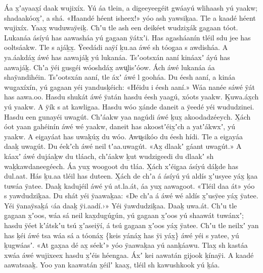 \begin{pairs}
\begin{Leftside}
Áa x̱ʼayaax̱í daak wujixíx.
Yú áa tlein, a digeeyeegéit gwáayú wlihaash yú yaakw; shadaakóox̱ʼ, a shá.
«\!Haandé héent isheex!\!» yóo ash yawsiḵaa.
Tle a kaa\-dé héent wujixíx.
Yaax̱ wuduwaÿeiḵ.
Chʼu tle ash een deikéet wudzix̱ák g̱agaan tóot.
\pend
\pstart
{}Lukanáa ásíyú has aawasháa yú g̱agaan ÿátxʼi.
Has ag̱asháanín tléil sdu jee has ool\-tsáakw.
Tle s ajáḵx̱.
Ÿeedádi aaÿí ḵu.aa áwé sh tóog̱aa s awdisháa.
A ya.áakdáx̱ áwé has aawajáḵ yú lukanáa.
Tsʼootsxán aaní kináaxʼ áyú has aawajáḵ.
Chʼa ÿéi gusgéi wóoshdáx̱ awu̬lisʼóow.
Ách áwé lukanáa áa shaÿandihéin.
Tsʼootsxán aaní, tle áxʼ áwé l gooháa.
Du éesh aaní, a kináa wug̱axíxín, yú g̱agaan yéi yandusḵéich:
«\!Héidu i éesh aaní.\!»
Wáa nanée sáwé ÿát has aawa.oo.
Hasdu shukát áwé ÿatán hasdu éesh yaagú, xóots yaakw.
Ḵuwa.áx̱ch yú yaakw.
A ÿík s at kawligaa.
Hasdu wóo x̱ánde daneit a ÿeedé yéi wududzinei.
Hasdu een g̱una\-yéi uwagút.
Chʼáakw yaa nagúdi áwé ḵux̱ akoodadzéeych.
X̱ách óot yaan g̱ahéinín áwé wé yaakw, daneit has akoostʼéix̱ʼch a yatʼákwxʼ, yú yaakw.
\pend
\pstart
{}A eig̱ayáat has uwaḵúx̱ du wóo.
Awu̬si\-kóo du éesh hídi.
Tle a eig̱ayáa daaḵ uwagút.
Du éekʼch áwé neil tʼaa.uwagút.
«\!Ax̱ dlaakʼ gáant uwagút.\!»
A káaxʼ áwé dujáaḵw du tláach, chʼáakw ḵut wudzigeedi du dlaakʼ sh waḵkawdaneegéech.
Áa yux̱ woogoot du tláa.
X̱ách xʼéig̱aa ásíyú dáḵde has dul.aat.
Hás ḵu.aa tléil has duteen.
X̱ách de chʼa á ásíyú yú aldís x̱ʼusyee yáx̱ ḵaa tuwáa ÿatee. 
Daaḵ kadujéil áwé yú at.la.át, áa yux̱ aawagoot.
«\!Tléil daa át\!» yóo s yawdudzi\-ḵaa.
Du shát yéi ÿaawaḵaa:
«\!De chʼa á áwé wé aldís x̱ʼusÿee yáx̱ ÿatee.
Yéi ÿanaÿsaḵá ‹\!áa daaḵ ÿi.aadí.\!›\!»
Yéi ÿawdudziḵaa.
Daaḵ uwa.át.
\pend
\pstart
{}Chʼu tle g̱agaan x̱ʼoos, wáa sá neil kax̱du\-gúg̱ún, yú g̱agaan x̱ʼoos yú shaawát tuwánxʼ;
hasdu ÿéet kʼátskʼu tsú x̱ʼaseiÿí, á tsú g̱agaan x̱ʼoos yáx̱ ÿatee.
Chʼu tle neilxʼ yan has ḵéi áwé tsa wáa sá a tóonáx̱ \{keis yánáx̱ has ÿi yáx̱\} áwé yéi s yatee, yú ḵugwáasʼ.
«\!At g̱ax̱aa dé ax̱ séekʼ\!» yóo ÿaawaḵaa yú aanḵáawu.
Tlax̱ sh kastáa xwáa áwé wujixeex hasdu x̱ʼéis héeng̱aa.
Áxʼ kei aawatán gijook ḵínaÿi.
A kaadé aawatsaaḵ.
Yoo yan kaawatán x̱éilʼ kaax̱, tléil sh kawushkook yú ḵáa.

\end{Leftside}
\end{pairs}
